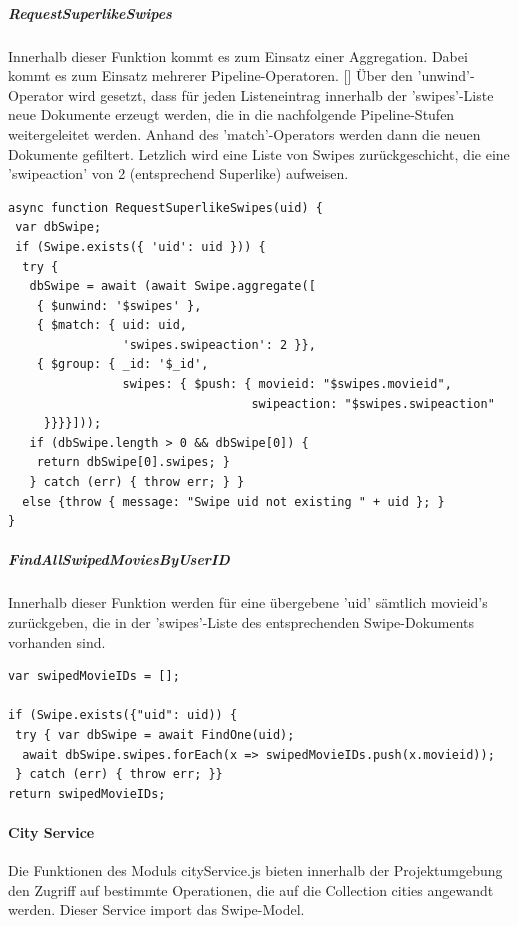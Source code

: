 \noindent
\subparagraph{RequestSuperlikeSwipes}
Innerhalb dieser Funktion kommt es zum Einsatz einer Aggregation. 
Dabei kommt es zum Einsatz mehrerer Pipeline-Operatoren. []
Über den 'unwind'-Operator wird gesetzt, dass für jeden Listeneintrag innerhalb der 'swipes'-Liste neue Dokumente erzeugt werden, die in die nachfolgende Pipeline-Stufen weitergeleitet werden. Anhand des 'match'-Operators werden dann die neuen Dokumente gefiltert. Letzlich wird eine Liste von Swipes zurückgeschicht, die eine 'swipeaction' von 2 (entsprechend Superlike) aufweisen.

\begin{lstlisting}[caption=Swipe Service - RequestSuperlikeSwipes, label=lst:swipeserviceRequestSuperlikeSwipes]
async function RequestSuperlikeSwipes(uid) {
 var dbSwipe;
 if (Swipe.exists({ 'uid': uid })) {
  try {
   dbSwipe = await (await Swipe.aggregate([
    { $unwind: '$swipes' },
    { $match: { uid: uid,
                'swipes.swipeaction': 2 }},
    { $group: { _id: '$_id',
                swipes: { $push: { movieid: "$swipes.movieid",
                                  swipeaction: "$swipes.swipeaction" 
     }}}}]));
   if (dbSwipe.length > 0 && dbSwipe[0]) {
    return dbSwipe[0].swipes; }
   } catch (err) { throw err; } }
  else {throw { message: "Swipe uid not existing " + uid }; }
}
\end{lstlisting}

\noindent
\subparagraph{FindAllSwipedMoviesByUserID}
Innerhalb dieser Funktion werden für eine übergebene 'uid' sämtlich movieid's zurückgeben, die in der 'swipes'-Liste des entsprechenden Swipe-Dokuments vorhanden sind.

\begin{lstlisting}[caption=Swipe Service - FindAllSwipedMoviesByUserID, label=lst:swipeserviceFindAllSwipedMoviesByUserID]
var swipedMovieIDs = [];
    
if (Swipe.exists({"uid": uid)) {
 try { var dbSwipe = await FindOne(uid);
  await dbSwipe.swipes.forEach(x => swipedMovieIDs.push(x.movieid));
 } catch (err) { throw err; }}
return swipedMovieIDs;
\end{lstlisting}


%
%
\paragraph{City Service}
Die Funktionen des Moduls cityService.js bieten innerhalb der Projektumgebung den Zugriff auf bestimmte Operationen, die auf die Collection cities angewandt werden. Dieser Service import das Swipe-Model.

